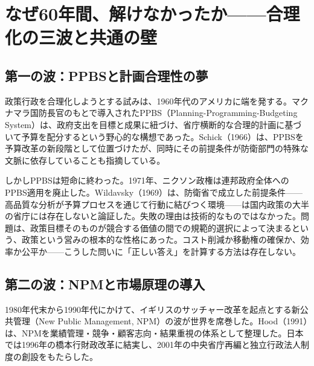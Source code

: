\section{なぜ60年間、解けなかったか——合理化の三波と共通の壁}
\label{sec:intro_history}

\subsection{第一の波：PPBSと計画合理性の夢}
\label{subsec:intro_ppbs}

政策行政を合理化しようとする試みは、1960年代のアメリカに端を発する。マクナマラ国防長官のもとで導入されたPPBS（Planning-Programming-Budgeting System）は、政府支出を目標と成果に紐づけ、省庁横断的な合理的計画に基づいて予算を配分するという野心的な構想であった\cite{schick1966ppb}。Schick（1966）は、PPBSを予算改革の新段階として位置づけたが、同時にその前提条件が防衛部門の特殊な文脈に依存していることも指摘している\cite{schick1966ppb}。

しかしPPBSは短命に終わった。1971年、ニクソン政権は連邦政府全体へのPPBS適用を廃止した。Wildavsky（1969）は、防衛省で成立した前提条件——高品質な分析が予算プロセスを通じて行動に結びつく環境——は国内政策の大半の省庁には存在しないと論証した\cite{wildavsky1969ppbs}。失敗の理由は技術的なものではなかった。問題は、政策目標そのものが競合する価値の間での規範的選択によって決まるという、政策という営みの根本的な性格にあった。コスト削減か移動権の確保か、効率か公平か——こうした問いに「正しい答え」を計算する方法は存在しない\cite{rittel1973,sugitani2021wicked}。

\subsection{第二の波：NPMと市場原理の導入}
\label{subsec:intro_npm}

1980年代末から1990年代にかけて、イギリスのサッチャー改革を起点とする新公共管理（New Public Management, NPM）の波が世界を席巻した。Hood（1991）は、NPMを業績管理・競争・顧客志向・結果重視の体系として整理した\cite{hood1991npm}。日本では1996年の橋本行財政改革に結実し、2001年の中央省庁再編と独立行政法人制度の創設をもたらした\cite{sugitani2024naze}。

